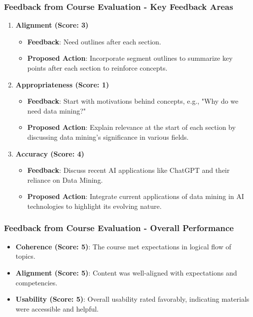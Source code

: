 \documentclass[aspectratio=169]{beamer}
\begin{document}
\begin{frame}[fragile]
    \frametitle{Feedback from Course Evaluation - Key Feedback Areas}
    \begin{enumerate}
        \item \textbf{Alignment (Score: 3)}
            \begin{itemize}
                \item \textbf{Feedback}: Need outlines after each section.
                \item \textbf{Proposed Action}: Incorporate segment outlines to summarize key points after each section to reinforce concepts.
            \end{itemize}
        
        \item \textbf{Appropriateness (Score: 1)}
            \begin{itemize}
                \item \textbf{Feedback}: Start with motivations behind concepts, e.g., "Why do we need data mining?"
                \item \textbf{Proposed Action}: Explain relevance at the start of each section by discussing data mining's significance in various fields.
            \end{itemize}

        \item \textbf{Accuracy (Score: 4)}
            \begin{itemize}
                \item \textbf{Feedback}: Discuss recent AI applications like ChatGPT and their reliance on Data Mining.
                \item \textbf{Proposed Action}: Integrate current applications of data mining in AI technologies to highlight its evolving nature.
            \end{itemize}
    \end{enumerate}
\end{frame}

\begin{frame}[fragile]
    \frametitle{Feedback from Course Evaluation - Overall Performance}
    \begin{itemize}
        \item \textbf{Coherence (Score: 5)}: The course met expectations in logical flow of topics.
        \item \textbf{Alignment (Score: 5)}: Content was well-aligned with expectations and competencies.
        \item \textbf{Usability (Score: 5)}: Overall usability rated favorably, indicating materials were accessible and helpful.
    \end{itemize}
\end{frame}
\end{document}
